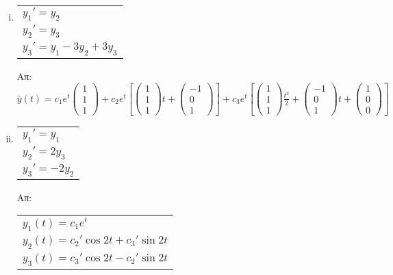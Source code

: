 \begin{enumerate}
\begin{enumerate}[i)]
\item  \begin{tabular}{l} $y_1'=y_2$ \\ $y_2'=y_3$ \\ $y_3'=y_1-3y_2+3y_3$\end{tabular} 

\hfill Απ: $\scriptstyle{\bar{y}(t)=c_1e^{t}\begin{pmatrix}
1\\1\\1
\end{pmatrix}+c_2e^{t}\left[\begin{pmatrix}
1\\1\\1
\end{pmatrix}t+\begin{pmatrix}
-1\\0\\1
\end{pmatrix}\right]+c_3e^{t}\left[\begin{pmatrix}
1\\1\\1
\end{pmatrix}\frac{t^2}{2}+\begin{pmatrix}
-1\\0\\1
\end{pmatrix}t+\begin{pmatrix}
1\\0\\0
\end{pmatrix}\right]}$

\item  \begin{tabular}{l} $y_1'=y_1$ \\ $y_2'=2y_3$ \\ $y_3'=-2y_2$\end{tabular}\hfill Απ: \begin{tabular}{l}
$y_1(t)=c_1e^t$ \\
$y_2(t)=c_2'\cos 2t+c_3'\sin 2t$ \\
$y_3(t)=c_3'\cos 2t-c_2'\sin 2t$
\end{tabular}

\end{enumerate}



\end{enumerate}


